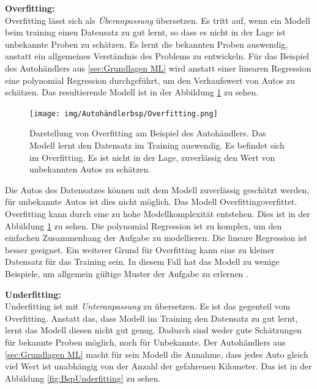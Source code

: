 \textbf{\gls{Overfitting}:}\\
\gls{Overfitting} lässt sich als \textit{Überanpassung} übersetzen. Es tritt auf, wenn ein Modell beim training einen Datensatz zu gut lernt, so dass es nicht in der Lage ist unbekannte Proben zu schätzen. Es lernt die bekannten Proben auswendig, anstatt ein allgemeines Verständnis des Problems zu entwickeln. Für das Beispiel des Autohändlers aus \ref{sec:Grundlagen ML} wird anstatt einer linearen Regression eine polynomial Regression durchgeführt, um den Verkaufswert von Autos zu schätzen. Das resultierende Modell ist in der Abbildung \ref{fig:BspOverfitting} zu sehen.

\begin{figure}[htb]
    \centering
    \texttt{[image: img/Autohändlerbsp/Overfitting.png]}
    \caption[Darstellung von Overfitting am Beispiel des Autohändlers.]{Darstellung von Overfitting am Beispiel des Autohändlers. Das Modell lernt den Datensatz im Training auswendig. Es befindet sich im Overfitting. Es ist nicht in der Lage, zuverlässig den Wert von unbekannten Autos zu schätzen.}
    \label{fig:BspOverfitting}
\end{figure}

Die Autos des Datensatzes können mit dem Modell zuverlässig geschätzt werden, für unbekannte Autos ist dies nicht möglich. Das Modell \gls{Overfitting}{overfittet}. \gls{Overfitting} kann durch eine zu hohe Modellkomplexität entstehen. Dies ist in der Abbildung \ref{fig:BspOverfitting} zu sehen. Die polynomial Regression ist zu komplex, um den einfachen Zusammenhang der Aufgabe zu modellieren. Die lineare Regression ist besser geeignet. Ein weiterer Grund für \gls{Overfitting} kann eine zu kleiner Datensatz für das Training sein. In diesem Fall hat das Modell zu wenige Beispiele, um allgemein gültige Muster der Aufgabe zu erlernen \cite{Burkov.2019, Bishop.2006, Goodfellow.2016}.\dubpar

\textbf{\gls{Underfitting}:}\\
\gls{Underfitting} ist mit \textit{Unteranpassung} zu übersetzen. Es ist das gegenteil vom \gls{Overfitting}. Anstatt das, dass Modell im Training den Datensatz zu gut lernt, lernt das Modell diesen nicht gut genug. Dadurch sind weder gute Schätzungen für bekannte Proben möglich, noch für Unbekannte. Der Autohändlers aus \ref{sec:Grundlagen ML} macht für sein Modell die Annahme, dass jedes Auto gleich viel Wert ist unabhängig von der Anzahl der gefahrenen Kilometer. Das ist in der Abbildung \ref{fig:BspUnderfitting} zu sehen.

